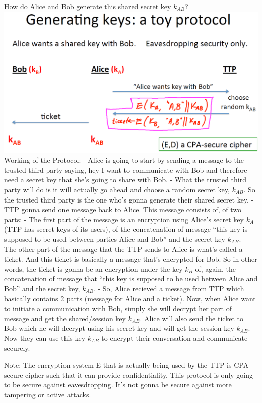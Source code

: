 \documentclass[11pt]{article}
\makeatletter
\def\maxwidth{\ifdim\Gin@nat@width>\linewidth\linewidth
    \else\Gin@nat@width\fi}
\let\Oldincludegraphics\includegraphics
\renewcommand{\includegraphics}[1]{\Oldincludegraphics[width=.8\maxwidth]{#1}}
\makeatother
\begin{document}
How do Alice and Bob generate this shared secret key \(k_{AB}\)?
\includegraphics{./Images/GeneratingKeys-ToyProtocol.png} Working of the
Protocol: - Alice is going to start by sending a message to the trusted
third party saying, hey I want to communicate with Bob and therefore
need a secret key that she's going to share with Bob. - What the trusted
third party will do is it will actually go ahead and choose a random
secret key, \(k_{AB}\). So the trusted third party is the one who's
gonna generate their shared secret key. - TTP gonna send one message
back to Alice. This message consists of, of two parts: - The first part
of the message is an encryption using Alice's secret key \(k_{A}\) (TTP
has secret keys of its users), of the concatenation of message ``this
key is supposed to be used between parties Alice and Bob'' and the
secret key \(k_{AB}\). - The other part of the message that the TTP
sends to Alice is what's called a ticket. And this ticket is basically a
message that's encrypted for Bob. So in other words, the ticket is gonna
be an encryption under the key \(k_{B}\) of, again, the concatenation of
message that ``this key is supposed to be used between Alice and Bob''
and the secret key, \(k_{AB}\). - So, Alice recieved a message from TTP
which basically contains 2 parts (message for Alice and a ticket). Now,
when Alice want to initiate a communication with Bob, simply she will
decrypt her part of message and get the shared/session key \(k_{AB}\).
Alice will also send the ticket to Bob which he will decrypt using his
secret key and will get the session key \(k_{AB}\). Now they can use
this key \(k_{AB}\) to encrypt their conversation and communicate
securely.

Note: The encryption system E that is actually being used by the TTP is
CPA secure cipher such that it can provide confidentiality. This
protocol is only going to be secure against eavesdropping. It's not
gonna be secure against more tampering or active attacks.
\end{document}
